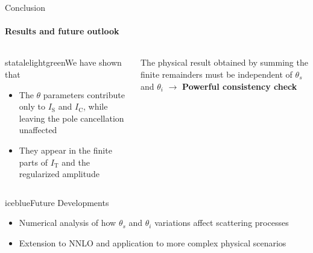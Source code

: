 \begin{frame} {Conclusion}
  \framesubtitle{Results and future outlook}

\begin{columns}
\begin{column}{0.60\textwidth}
    \begin{colorblock}[black]{statalelightgreen}{We have shown that}
  \begin{itemize}
    \item The $\theta$ parameters contribute only to $I_\mathrm{S}$ and $I_\mathrm{C}$, while leaving the pole cancellation unaffected
    \item They appear in the finite parts of $I_\mathrm{T}$ and the regularized amplitude
\end{itemize}
      \end{colorblock}

    \end{column}

    \begin{column}{0.40\textwidth}
    The physical result obtained by summing the finite remainders must be independent of $\theta_s$ and $\theta_i$
    $\to$ \textbf{Powerful consistency check}
    \end{column}
\end{columns}

 \vspace{1.5em}
\begin{colorblock}[black]{iceblue}{Future Developments}
  \begin{itemize}
    \item Numerical analysis of how $\theta_s$ and $\theta_i$ variations affect scattering processes
    \item Extension to NNLO and application to more complex physical scenarios
  \end{itemize}
\end{colorblock}

\end{frame}
